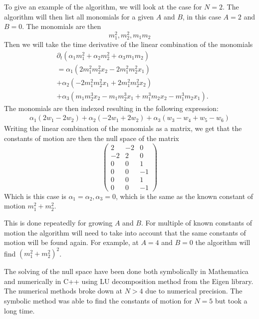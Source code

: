 \documentclass[english,master]{liumaiex}
\theoremstyle{plain}
\theoremstyle{definition}
\begin{document}
To give an example of the algorithm, we will look at the case for $N = 2$. The algorithm will then list all monomials for a given $A$ and $B$, in this case $A = 2$ and $B = 0$. The monomials are then
\begin{equation}
	m_1^2, m_2^2, m_1 m_2
\end{equation}
Then we will take the time derivative of the linear combination of the monomials
\begin{equation}
\begin{aligned}
	&\partial_t (\alpha_1 m_1^2 + \alpha_2 m_2^2 + \alpha_3 m_1 m_2) \\
	&= \alpha_1 (2m_1^2 m_2^2 x_2 - 2m_1^2 m_2^2 x_1) \\
	&+ \alpha_2 (-2m_1^2 m_2^2 x_1 + 2m_1^2 m_2^2 x_2) \\
	&+ \alpha_3 (m_1 m_2^3 x_2 - m_1 m_2^3 x_1 + m_1^3 m_2 x_2 - m_1^3 m_2 x_1).
\end{aligned}
\end{equation}
The monomials are then indexed resulting in the following expression:
\begin{equation}
\begin{aligned}
	\alpha_1 (2w_1 - 2w_2)
	+ \alpha_2 (-2w_1 + 2w_2)
	+ \alpha_3 (w_3 - w_4 + w_5 - w_6)
\end{aligned}
\end{equation}
Writing the linear combination of the monomials as a matrix, we get that the constants of motion are then the null space of the matrix
\begin{equation}
\begin{pmatrix}
	2 & -2 & 0 \\
	-2 & 2 & 0 \\
	0 & 0 & 1 \\
	0 & 0 & -1 \\
	0 & 0 & 1 \\
	0 & 0 & -1
\end{pmatrix}
\end{equation}
Which is this case is $\alpha_1 = \alpha_2, \alpha_3 = 0$, which is the same as the known constant of motion $m_1^2 + m_2^2$.

This is done repeatedly for growing $A$ and $B$. For multiple of known constants of motion the algorithm will need to take into account that the same constants of motion will be found again. For example, at $A = 4$ and $B = 0$ the algorithm will find $(m_1^2 + m_2^2)^2$.

The solving of the null space have been done both symbolically in Mathematica and numerically in C++ using LU decomposition method from the Eigen library. The numerical methods broke down at $N > 4$ due to numerical precision. The symbolic method was able to find the constants of motion for $N = 5$ but took a long time.
\end{document}
